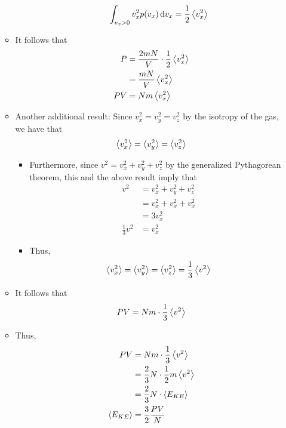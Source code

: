 \documentclass[../notes.tex]{subfiles}
\begin{document}
\begin{itemize}
\begin{itemize}
\begin{itemize}
\begin{equation*}
                \int_{v_x>0}v_x^2p(v_x)\dd{v_x} = \frac{1}{2}\left\langle{v_x^2}\right\rangle
            \end{equation*}
        \end{itemize}
        \item It follows that
        \begin{align*}
            P &= \frac{2mN}{V}\cdot\frac{1}{2}\left\langle{v_x^2}\right\rangle\\
            &= \frac{mN}{V}\left\langle{v_x^2}\right\rangle\\
            PV &= Nm\left\langle{v_x^2}\right\rangle
        \end{align*}
        \item Another additional result: Since $v_x^2=v_y^2=v_z^2$ by the isotropy of the gas, we have that
        \begin{equation*}
            \left\langle{v_x^2}\right\rangle = \left\langle{v_y^2}\right\rangle = \left\langle{v_z^2}\right\rangle
        \end{equation*}
        \begin{itemize}
            \item Furthermore, since $v^2=v_x^2+v_y^2+v_z^2$ by the generalized Pythagorean theorem, this and the above result imply that
            \begin{align*}
                v^2 &= v_x^2+v_y^2+v_z^2\\
                &= v_x^2+v_x^2+v_x^2\\
                &= 3v_x^2\\
                \frac{1}{3}v^2 &= v_x^2
            \end{align*}
            \item Thus,
            \begin{equation*}
                \left\langle{v_x^2}\right\rangle = \left\langle{v_y^2}\right\rangle = \left\langle{v_z^2}\right\rangle = \frac{1}{3}\left\langle{v^2}\right\rangle
            \end{equation*}
        \end{itemize}
        \item It follows that
        \begin{equation*}
            PV = Nm\cdot\frac{1}{3}\left\langle{v^2}\right\rangle
        \end{equation*}
        \item Thus,
        \begin{align*}
            PV &= Nm\cdot\frac{1}{3}\prb{v^2}\\
            &= \frac{2}{3}N\cdot\frac{1}{2}m\prb{v^2}\\
            &= \frac{2}{3}N\cdot\prb{E_{KE}}\\
            \prb{E_{KE}} &= \frac{3}{2}\frac{PV}{N}\\

\end{align*}
\end{itemize}
\end{itemize}
\end{document}
